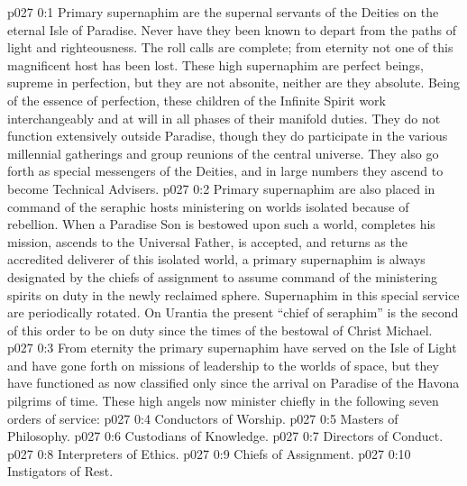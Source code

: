 \author{Perfector of Wisdom}
\vs p027 0:1 Primary supernaphim are the supernal servants of the Deities on the eternal Isle of Paradise. Never have they been known to depart from the paths of light and righteousness. The roll calls are complete; from eternity not one of this magnificent host has been lost. These high supernaphim are perfect beings, supreme in perfection, but they are not absonite, neither are they absolute. Being of the essence of perfection, these children of the Infinite Spirit work interchangeably and at will in all phases of their manifold duties. They do not function extensively outside Paradise, though they do participate in the various millennial gatherings and group reunions of the central universe. They also go forth as special messengers of the Deities, and in large numbers they ascend to become Technical Advisers.
\vs p027 0:2 Primary supernaphim are also placed in command of the seraphic hosts ministering on worlds isolated because of rebellion. When a Paradise Son is bestowed upon such a world, completes his mission, ascends to the Universal Father, is accepted, and returns as the accredited deliverer of this isolated world, a primary supernaphim is always designated by the chiefs of assignment to assume command of the ministering spirits on duty in the newly reclaimed sphere. Supernaphim in this special service are periodically rotated. On Urantia the present “chief of seraphim” is the second of this order to be on duty since the times of the bestowal of Christ Michael.
\vs p027 0:3 From eternity the primary supernaphim have served on the Isle of Light and have gone forth on missions of leadership to the worlds of space, but they have functioned as now classified only since the arrival on Paradise of the Havona pilgrims of time. These high angels now minister chiefly in the following seven orders of service:
\vs p027 0:4 \bibnobreakspace Conductors of Worship.
\vs p027 0:5 \bibnobreakspace Masters of Philosophy.
\vs p027 0:6 \bibnobreakspace Custodians of Knowledge.
\vs p027 0:7 \bibnobreakspace Directors of Conduct.
\vs p027 0:8 \bibnobreakspace Interpreters of Ethics.
\vs p027 0:9 \bibnobreakspace Chiefs of Assignment.
\vs p027 0:10 \bibnobreakspace Instigators of Rest.
